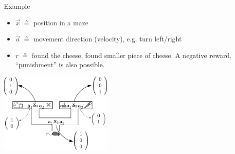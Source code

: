 \begin{frame}{Example}

\begin{itemize}
\item $\vec x \; \corresponds$ position in a maze
\item $\vec a \; \corresponds$ movement direction (velocity), e.g. turn left/right
\item $r \; \corresponds$ found the cheese, found smaller piece of cheese. A negative reward, ``punishment'' is also possible.
\end{itemize}



\begin{center}
	\includegraphics[height=4cm]{img/mouse_labyrinth_actions}
\end{center}

\end{frame}


\begin{frame}
    

\end{frame}


